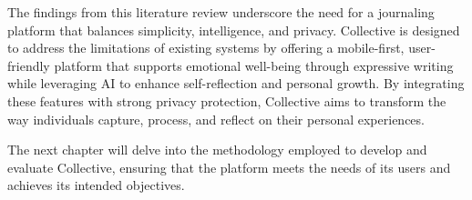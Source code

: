 The findings from this literature review underscore the need for a journaling platform that balances simplicity, intelligence, and privacy. Collective is designed to address the limitations of existing systems by offering a mobile-first, user-friendly platform that supports emotional well-being through expressive writing while leveraging AI to enhance self-reflection and personal growth. By integrating these features with strong privacy protection, Collective aims to transform the way individuals capture, process, and reflect on their personal experiences.

The next chapter will delve into the methodology employed to develop and evaluate Collective, ensuring that the platform meets the needs of its users and achieves its intended objectives.


